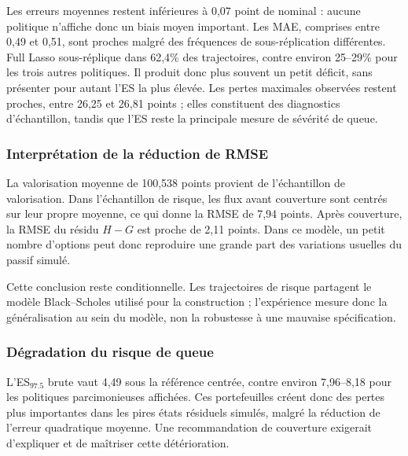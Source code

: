 
Les erreurs moyennes restent inférieures à 0,07 point de nominal : aucune politique
n'affiche donc un biais moyen important. Les MAE, comprises entre 0,49 et 0,51,
sont proches malgré des fréquences de sous-réplication différentes. Full Lasso
sous-réplique dans 62,4\% des trajectoires, contre environ 25--29\% pour les trois
autres politiques. Il produit donc plus souvent un petit déficit, sans présenter
pour autant l'ES la plus élevée. Les pertes maximales observées restent proches,
entre 26,25 et 26,81 points ; elles constituent des diagnostics d'échantillon,
tandis que l'ES reste la principale mesure de sévérité de queue.

\subsubsection*{Interprétation de la réduction de RMSE}

La valorisation moyenne de 100,538 points provient de l'échantillon de valorisation. Dans l'échantillon de risque, les flux avant couverture sont centrés sur leur propre moyenne, ce qui donne la RMSE de 7,94 points. Après couverture, la RMSE du résidu $H-G$ est proche de 2,11 points. Dans ce modèle, un petit nombre d'options peut donc reproduire une grande part des variations usuelles du passif simulé.

Cette conclusion reste conditionnelle. Les trajectoires de risque partagent le modèle Black--Scholes utilisé pour la construction ; l'expérience mesure donc la généralisation au sein du modèle, non la robustesse à une mauvaise spécification.

\subsubsection*{Dégradation du risque de queue}

L'ES$_{97.5}$ brute vaut 4,49 sous la référence centrée, contre environ 7,96--8,18 pour les politiques parcimonieuses affichées. Ces portefeuilles créent donc des pertes plus importantes dans les pires états résiduels simulés, malgré la réduction de l'erreur quadratique moyenne. Une recommandation de couverture exigerait d'expliquer et de maîtriser cette détérioration.

